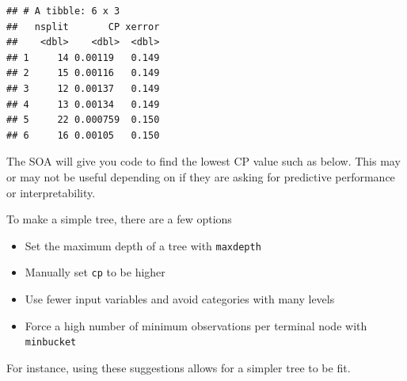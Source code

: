 \documentclass[openany]{book}
\newenvironment{Shaded}{\begin{snugshade}}{\end{snugshade}}
\newcommand{\DataTypeTok}[1]{\textcolor[rgb]{0.13,0.29,0.53}{#1}}
\newcommand{\KeywordTok}[1]{\textcolor[rgb]{0.13,0.29,0.53}{\textbf{#1}}}
\newcommand{\NormalTok}[1]{#1}
\newcommand{\OperatorTok}[1]{\textcolor[rgb]{0.81,0.36,0.00}{\textbf{#1}}}
\newcommand{\StringTok}[1]{\textcolor[rgb]{0.31,0.60,0.02}{#1}}
\providecommand{\tightlist}{%
  \setlength{\itemsep}{0pt}\setlength{\parskip}{0pt}}
\begin{document}
\begin{verbatim}
## # A tibble: 6 x 3
##   nsplit       CP xerror
##    <dbl>    <dbl>  <dbl>
## 1     14 0.00119   0.149
## 2     15 0.00116   0.149
## 3     12 0.00137   0.149
## 4     13 0.00134   0.149
## 5     22 0.000759  0.150
## 6     16 0.00105   0.150
\end{verbatim}

The SOA will give you code to find the lowest CP value such as below. This may or may not be useful depending on if they are asking for predictive performance or interpretability.

\begin{Shaded}
\end{Shaded}

To make a simple tree, there are a few options

\begin{itemize}
\tightlist
\item
  Set the maximum depth of a tree with \texttt{maxdepth}
\item
  Manually set \texttt{cp} to be higher
\item
  Use fewer input variables and avoid categories with many levels
\item
  Force a high number of minimum observations per terminal node with \texttt{minbucket}
\end{itemize}

For instance, using these suggestions allows for a simpler tree to be fit.
\end{document}

